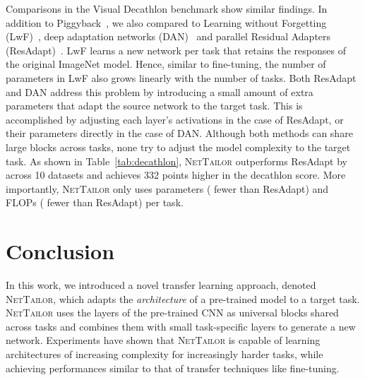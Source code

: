 \documentclass[10pt,twocolumn,letterpaper]{article}
\begin{document}
Comparisons in the Visual Decathlon benchmark show similar findings. 
In addition to Piggyback~\cite{mallya2018piggyback}, we also compared to Learning without Forgetting (LwF)~\cite{li2017LwF}, deep adaptation networks (DAN)~\cite{rosenfeld2018incremental} and parallel Residual Adapters (ResAdapt)~\cite{rebuffi2018efficient}. 
LwF learns a new network per task that retains the responses of the original ImageNet model. 
Hence, similar to fine-tuning, the number of parameters in LwF also grows linearly with the number of tasks.
Both ResAdapt and DAN address this problem by introducing a small amount of extra parameters that adapt the source network to the target task. This is accomplished by adjusting each layer's activations in the case of ResAdapt, or their parameters directly in the case of DAN.
Although both methods can share large blocks across tasks, none try to adjust the model complexity to the target task.
As shown in Table~\ref{tab:decathlon}, \textsc{NetTailor} outperforms ResAdapt by  across 10 datasets and achieves 332 points higher in the decathlon score.
More importantly, \textsc{NetTailor} only uses  parameters ( fewer than ResAdapt) and  FLOPs ( fewer than ResAdapt) per task.


 
\vspace{-3pt}
\section{Conclusion}
\vspace{-3pt}
In this work, we introduced a novel transfer learning approach, denoted \textsc{NetTailor}, which adapts the \textit{architecture} of a pre-trained model to a target task.
\textsc{NetTailor} uses the layers of the pre-trained CNN as universal blocks shared across tasks and combines them with small task-specific layers to generate a new network. 
Experiments have shown that \textsc{NetTailor} is capable of learning architectures of increasing complexity for increasingly harder tasks, while achieving performances similar to that of transfer techniques like fine-tuning.
 


{\small


}
\end{document}
